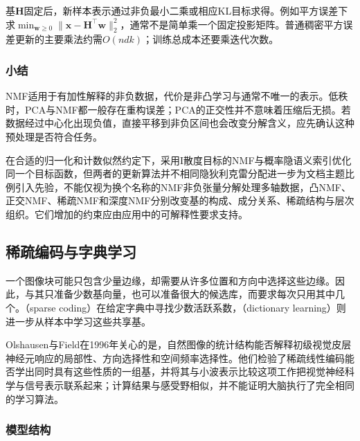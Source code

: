 基$\bm{H}$固定后，新样本表示通过非负最小二乘或相应KL目标求得。例如平方误差下求$\min_{\bm{w}\geq0}\lVert\bm{x}-\bm{H}^{\top}\bm{w}\rVert_2^2$，通常不是简单乘一个固定投影矩阵。普通稠密平方误差更新的主要乘法约需$O(ndk)$；训练总成本还要乘迭代次数。

\subsubsection{小结}
\label{sec:dim-nmf-summary}

NMF适用于有加性解释的非负数据，代价是非凸学习与通常不唯一的表示。低秩时，PCA与NMF都一般存在重构误差；PCA的正交性并不意味着压缩后无损。若数据经过中心化出现负值，直接平移到非负区间也会改变分解含义，应先确认这种预处理是否符合任务。

在合适的归一化和计数似然约定下，采用I散度目标的NMF与概率隐语义索引优化同一个目标函数，但两者的更新算法并不相同隐狄利克雷分配进一步为文档主题比例引入先验，不能仅视为换个名称的NMF非负张量分解处理多轴数据，凸NMF、正交NMF、稀疏NMF和深度NMF分别改变基的构成、成分关系、稀疏结构与层次组织。它们增加的约束应由应用中的可解释性要求支持。

\subsection{稀疏编码与字典学习}
\label{sec:dim-sparse-coding}

一个图像块可能只包含少量边缘，却需要从许多位置和方向中选择这些边缘。因此，与其只准备少数基向量，也可以准备很大的候选库，而要求每次只用其中几个。（sparse coding）在给定字典中寻找少数活跃系数，（dictionary learning）则进一步从样本中学习这些共享基。

Olshausen与Field在1996年关心的是，自然图像的统计结构能否解释初级视觉皮层神经元响应的局部性、方向选择性和空间频率选择性。他们检验了稀疏线性编码能否学出同时具有这些性质的一组基，并将其与小波表示比较这项工作把视觉神经科学与信号表示联系起来；计算结果与感受野相似，并不能证明大脑执行了完全相同的学习算法。

\subsubsection{模型结构}
\label{sec:dim-sparse-coding-structure}


